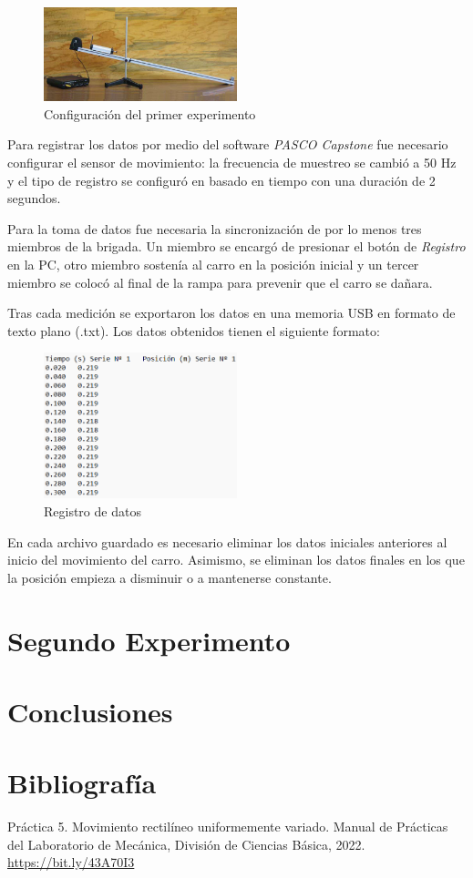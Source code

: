 \documentclass[12pt, titlepage]{report}
\begin{document}
    \begin{figure}[ht]
        \centering
        \setcounter{figure}{0}
        \includegraphics[width=0.5\textwidth]{Rampa_Exp1.png}
        \caption{Configuración del primer experimento}
    \end{figure}

    Para registrar los datos por medio del software \textit{PASCO Capstone} fue necesario configurar el sensor de movimiento: la frecuencia de muestreo se cambió a 50 Hz y el tipo de registro se configuró en basado en tiempo con una duración de 2 segundos. 

    Para la toma de datos fue necesaria la sincronización de por lo menos tres miembros de la brigada. Un miembro se encargó de presionar el botón de \textit{Registro} en la PC, otro miembro sostenía al carro en la posición inicial y un tercer miembro se colocó al final de la rampa para prevenir que el carro se dañara.

    Tras cada medición se exportaron los datos en una memoria USB en formato de texto plano (.txt). Los datos obtenidos tienen el siguiente formato:

    \begin{figure}[ht]
        \centering
        \includegraphics[width=0.5\textwidth]{Formato_Datos.png}
        \caption{Registro de datos}
    \end{figure}
    
    En cada archivo guardado es necesario eliminar los datos iniciales anteriores al inicio del movimiento del carro. Asimismo, se eliminan los datos finales en los que la posición empieza a disminuir o a mantenerse constante.
    

    \section*{Segundo Experimento}


    \newpage
    \section*{Conclusiones}

    \section*{Bibliografía}
    Práctica 5. Movimiento rectilíneo uniformemente variado. Manual de Prácticas del Laboratorio de Mecánica, División de Ciencias Básica, 2022. \url{https://bit.ly/43A70I3}
    
\end{document}
